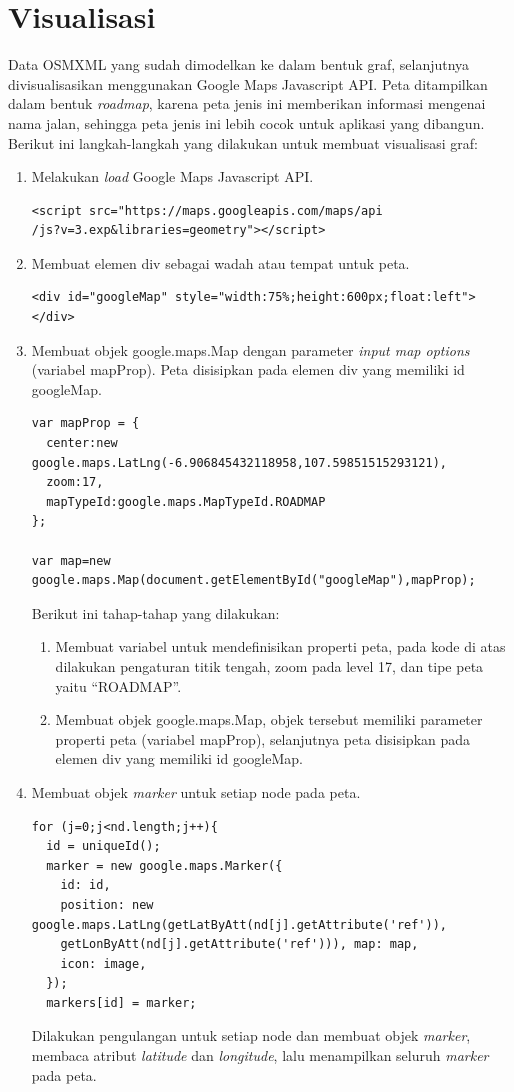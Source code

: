 \section{Visualisasi} \label{ssec:analisis_gmap}
Data OSMXML yang sudah dimodelkan ke dalam bentuk graf, selanjutnya
divisualisasikan menggunakan Google Maps Javascript API. Peta ditampilkan dalam 
bentuk \textit{roadmap}, karena peta jenis ini memberikan 
informasi mengenai nama jalan, sehingga peta jenis ini lebih cocok untuk aplikasi 
yang dibangun. Berikut ini langkah-langkah yang dilakukan untuk membuat
visualisasi graf:
\begin{enumerate}
  \item Melakukan \textit{load} Google Maps Javascript API.
\begin{verbatim}
<script src="https://maps.googleapis.com/maps/api
/js?v=3.exp&libraries=geometry"></script>
\end{verbatim}

  \item Membuat elemen div sebagai wadah atau tempat untuk peta.
\begin{verbatim}
<div id="googleMap" style="width:75%;height:600px;float:left"></div>
\end{verbatim}
  
  \item Membuat objek google.maps.Map dengan parameter \textit{input map
  options} (variabel mapProp). Peta disisipkan pada elemen div yang memiliki id
  googleMap.
\begin{verbatim}
var mapProp = {
  center:new google.maps.LatLng(-6.906845432118958,107.59851515293121),
  zoom:17,
  mapTypeId:google.maps.MapTypeId.ROADMAP
};

var map=new google.maps.Map(document.getElementById("googleMap"),mapProp);
\end{verbatim}
  Berikut ini tahap-tahap yang dilakukan:
  \begin{enumerate}
    \item Membuat variabel untuk mendefinisikan properti peta, pada kode
    di atas dilakukan pengaturan titik tengah, zoom pada level 17, dan tipe peta
    yaitu ``ROADMAP''.
    
    \item Membuat objek google.maps.Map, objek tersebut memiliki parameter
    properti peta (variabel mapProp), selanjutnya peta disisipkan pada elemen
    div yang memiliki id googleMap.
  \end{enumerate}

  \item Membuat objek \textit{marker} untuk setiap node pada peta.
\begin{verbatim}
for (j=0;j<nd.length;j++){
  id = uniqueId();
  marker = new google.maps.Marker({
    id: id,
    position: new google.maps.LatLng(getLatByAtt(nd[j].getAttribute('ref')),
    getLonByAtt(nd[j].getAttribute('ref'))), map: map,
    icon: image,
  });
  markers[id] = marker;
\end{verbatim}
  Dilakukan pengulangan untuk setiap node dan membuat objek \textit{marker},
  membaca atribut \textit{latitude} dan \textit{longitude}, lalu menampilkan
  seluruh \textit{marker} pada peta.


\end{enumerate}
